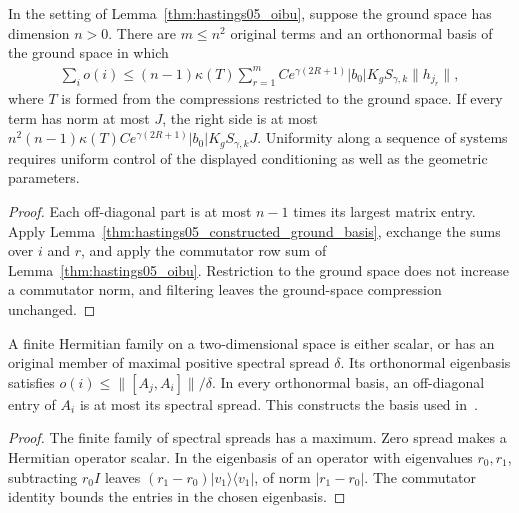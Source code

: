 \begin{lemma}
    \label{thm:hastings05_constructed_oibu}
    \leanok
    In the setting of Lemma~\ref{thm:hastings05_oibu}, suppose the ground
    space has dimension $n>0$. There are $m\le n^2$ original terms and an
    orthonormal basis of the ground space in which
    \begin{align*}
        \sum_i o(i)\le(n-1)\kappa(T)\sum_{r=1}^m
        Ce^{\gamma(2R+1)}|b_0|K_gS_{\gamma,k}\|h_{j_r}\|,
    \end{align*}
    where $T$ is formed from the compressions restricted to the ground space.
    If every term has norm at most $J$, the right side is at most
    $n^2(n-1)\kappa(T)Ce^{\gamma(2R+1)}|b_0|K_gS_{\gamma,k}J$.
    Uniformity along a sequence of systems requires uniform control of the
    displayed conditioning as well as the geometric parameters.
\end{lemma}
\begin{proof}\leanok
    Each off-diagonal part is at most $n-1$ times its largest matrix entry.
    Apply Lemma~\ref{thm:hastings05_constructed_ground_basis}, exchange the
    sums over $i$ and $r$, and apply the commutator row sum of
    Lemma~\ref{thm:hastings05_oibu}. Restriction to the ground space does not
    increase a commutator norm, and filtering leaves the ground-space
    compression unchanged.
\end{proof}

\begin{lemma}
    \label{thm:hastings05_two_dim_basis_construction}
    \leanok
    A finite Hermitian family on a two-dimensional space is either scalar, or
    has an original member of maximal positive spectral spread $\delta$.
    Its orthonormal eigenbasis satisfies $o(i)\le\|[A_j,A_i]\|/\delta$.
    In every orthonormal basis, an off-diagonal entry of $A_i$ is at most its
    spectral spread. This constructs the basis used
    in~\cite[lines 1678--1694]{Hastings2006Solving}.
\end{lemma}
\begin{proof}\leanok
    The finite family of spectral spreads has a maximum. Zero spread makes a
    Hermitian operator scalar. In the eigenbasis of an operator with eigenvalues
    $r_0,r_1$, subtracting $r_0I$ leaves
    $(r_1-r_0)|v_1\rangle\langle v_1|$, of norm $|r_1-r_0|$.
    The commutator identity bounds the entries in the chosen eigenbasis.
\end{proof}


